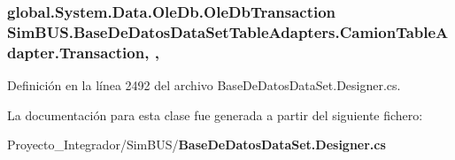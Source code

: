 \subsubsection[{Transaction}]{\setlength{\rightskip}{0pt plus 5cm}global.\-System.\-Data.\-Ole\-Db.\-Ole\-Db\-Transaction Sim\-B\-U\-S.\-Base\-De\-Datos\-Data\-Set\-Table\-Adapters.\-Camion\-Table\-Adapter.\-Transaction\hspace{0.3cm}{\ttfamily [get]}, {\ttfamily [set]}, {\ttfamily [package]}}\label{class_sim_b_u_s_1_1_base_de_datos_data_set_table_adapters_1_1_camion_table_adapter_ac9a79fad4e941e11eb327c0d43f43aa0}


Definición en la línea 2492 del archivo Base\-De\-Datos\-Data\-Set.\-Designer.\-cs.



La documentación para esta clase fue generada a partir del siguiente fichero\-:\begin{DoxyCompactItemize}
\item 
Proyecto\-\_\-\-Integrador/\-Sim\-B\-U\-S/{\bf Base\-De\-Datos\-Data\-Set.\-Designer.\-cs}\end{DoxyCompactItemize}

